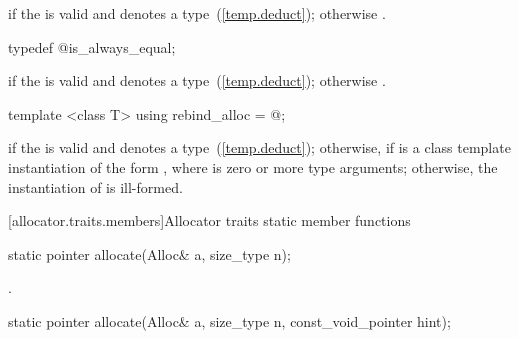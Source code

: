 \begin{itemdescr}
\pnum
\ctype {} if
the   is valid and denotes a
type~(\ref{temp.deduct}); otherwise
.
\end{itemdescr}

%
%
\begin{itemdecl}
typedef @\seebelow@ is_always_equal;
\end{itemdecl}

\begin{itemdescr}
\pnum
\ctype {} if
the  
is valid and denotes a type~(\ref{temp.deduct});
otherwise .
\end{itemdescr}

%
%
\begin{itemdecl}
template <class T> using rebind_alloc = @\seebelow@;
\end{itemdecl}

\begin{itemdescr}
\pnum
\templalias {} if
the   is valid and denotes a
type~(\ref{temp.deduct}); otherwise,
 if  is a class template instantiation
of the form , where  is zero or more type arguments;
otherwise, the instantiation of  is ill-formed.
\end{itemdescr}

[allocator.traits.members]{Allocator traits static member functions}

%
%
\begin{itemdecl}
static pointer allocate(Alloc& a, size_type n);
\end{itemdecl}

\begin{itemdescr}
\pnum
\returns {}.
\end{itemdescr}

%
%
\begin{itemdecl}
static pointer allocate(Alloc& a, size_type n, const_void_pointer hint);
\end{itemdecl}

